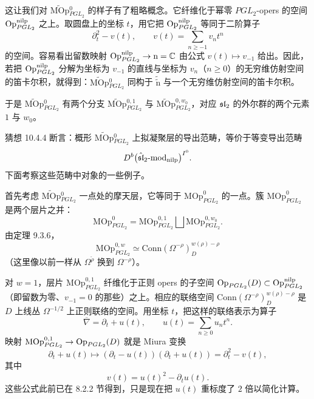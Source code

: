这让我们对 $\widetilde{\mathrm{MOp}}{}^0_{PGL_2}$ 的样子有了粗略概念。它纤维化于幂零 $PGL_2$-opers 的空间 $\operatorname{Op}^{\mathrm{nilp}}_{PGL_2}$ 之上。取圆盘上的坐标 $t$，用它把 $\operatorname{Op}^{\mathrm{nilp}}_{PGL_2}$ 等同于二阶算子
\[
    \partial_t^2-v(t),\qquad v(t)=\sum_{n\ge-1}v_nt^n
\]
的空间。容易看出留数映射 $\operatorname{Op}^{\mathrm{nilp}}_{PGL_2}\to\mathrm{n}=\mathbb{C}$ 由公式 $v(t)\mapsto v_{-1}$ 给出。因此，若把 $\operatorname{Op}^{\mathrm{nilp}}_{PGL_2}$ 分解为坐标为 $v_{-1}$ 的直线与坐标为 $v_n$（$n\ge0$）的无穷维仿射空间的笛卡尔积，就得到：$\widetilde{\mathrm{MOp}}{}^0_{PGL_2}$ 同构于 $\widetilde{\widetilde{\mathrm{n}}}$ 与一个无穷维仿射空间的笛卡尔积。

于是 $\widetilde{\mathrm{MOp}}{}^0_{PGL_2}$ 有两个分支 $\widetilde{\mathrm{MOp}}{}^{0,1}_{PGL_2}$ 与 $\widetilde{\mathrm{MOp}}{}^{0,w_0}_{PGL_2}$，对应 $\mathfrak{sl}_2$ 的外尔群的两个元素 $1$ 与 $w_0$。

猜想 10.4.4 断言：概形 $\widetilde{\mathrm{MOp}}{}^0_{PGL_2}$ 上拟凝聚层的导出范畴，等价于等变导出范畴
\[
    D^b\bigl(\hat{\mathfrak{sl}}_2\text{-}\mathrm{mod}_{\mathrm{nilp}}\bigr)^{I^0}.
\]
下面考察这些范畴中对象的一些例子。

首先考虑 $\widetilde{\mathrm{MOp}}{}^0_{PGL_2}$ 一点处的摩天层，它等同于 $\mathrm{MOp}^0_{PGL_2}$ 的一点。簇 $\mathrm{MOp}^0_{PGL_2}$ 是两个层片之并：
\[
    \mathrm{MOp}^0_{PGL_2}
    =\mathrm{MOp}^{0,1}_{PGL_2}
    \bigsqcup
    \mathrm{MOp}^{0,w_0}_{PGL_2}.
\]
由定理 9.3.6，
\[
    \mathrm{MOp}^{0,w}_{PGL_2}
    \simeq\mathrm{Conn}(\Omega^{-\rho})^{w(\rho)-\rho}_D
\]
（这里像以前一样从 $\Omega^{\check\rho}$ 换到 $\Omega^{-\rho}$）。

对 $w=1$，层片 $\mathrm{MOp}^{0,1}_{PGL_2}$ 纤维化于正则 opers 的子空间 $\operatorname{Op}_{PGL_2}(D)\subset\operatorname{Op}^{\mathrm{nilp}}_{PGL_2}$（即留数为零、$v_{-1}=0$ 的那些）之上。相应的联络空间 $\mathrm{Conn}(\Omega^{-\rho})^{w(\rho)-\rho}_D$ 是 $D$ 上线丛 $\Omega^{-1/2}$ 上正则联络的空间。用坐标 $t$，把这样的联络表示为算子
\[
    \overline{\nabla}=\partial_t+u(t),\qquad u(t)=\sum_{n\ge0}u_nt^n.
\]
映射 $\mathrm{MOp}^{0,1}_{PGL_2}\to\operatorname{Op}_{PGL_2}(D)$ 就是 Miura 变换
\[
    \partial_t+u(t)\longmapsto
    (\partial_t-u(t))(\partial_t+u(t))=\partial_t^2-v(t),
\]
其中
\begin{equation}
    v(t)=u(t)^2-\partial_tu(t).
    \tag{10.4-19}
\end{equation}
这些公式此前已在 8.2.2 节得到，只是现在把 $u(t)$ 重标度了 $2$ 倍以简化计算。

